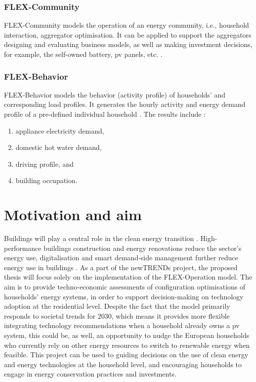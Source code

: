 \subsubsection{FLEX-Community}


FLEX-Community models the operation of an energy community, i.e., household interaction, aggregator optimisation. 
It can be applied to support the aggregators designing and evaluating business models, as well as making investment decisions, for example, the self-owned battery, \gls{pv} panels, etc. \cite{newtrends}.


\subsubsection{FLEX-Behavior}


FLEX-Behavior models the behavior (activity profile) of households' and corresponding load profiles. 
It generates the hourly activity and energy demand profile of a pre-defined individual household \cite{newtrends}. 
The results include \cite{newtrends}: 

\begin{enumerate}
  \item appliance electricity demand,
  \item domestic hot water demand,
  \item driving profile, and
  \item building occupation.
\end{enumerate}




\section{Motivation and aim}




Buildings will play a central role in the clean energy transition \cite{building}.
High-performance buildings construction and energy renovations reduce the sector’s energy use, digitalisation and smart demand-side management further reduce energy use in buildings \cite{building}.  
As a part of the newTRENDs project, 
the proposed thesis will focus solely on 
the implementation of the FLEX-Operation model.  
The aim is to provide techno-economic assessments 
of configuration optimisations of households' energy systems, 
in order to support decision-making on technology adoption at the residential level. 
Despite the fact that the model primarily responds to societal trends for 2030, 
which means it provides more flexible integrating technology recommendations when a household already owns a \gls{pv} system, 
this could be, as well, an opportunity to nudge the European households who currently rely on other energy resources
to switch to renewable energy when feasible. 
This project can be used to 
guiding decisions on the use of clean energy and energy technologies at the household level, 
and encouraging households to engage in energy conservation practices and investments. 


